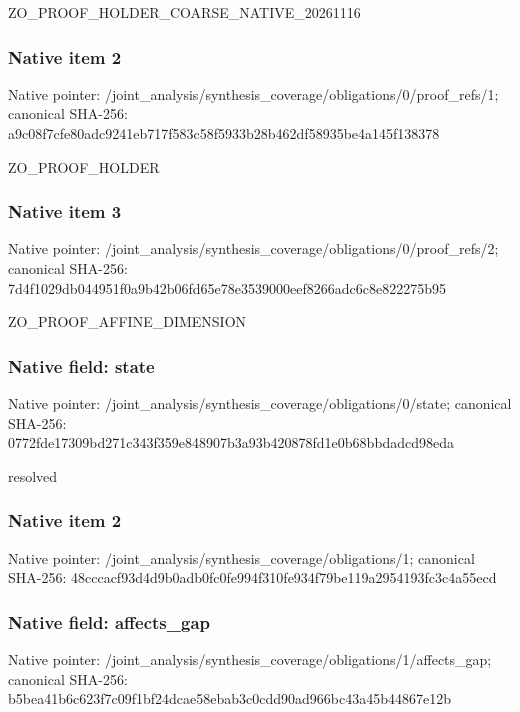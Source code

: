 \documentclass[10pt,a4paper]{article}
\begin{document}
\begingroup\raggedright\sloppy ZO\_\allowbreak{}PROOF\_\allowbreak{}HOLDER\_\allowbreak{}COARSE\_\allowbreak{}NATIVE\_\allowbreak{}20261116\par\endgroup

\subsubsection{Native item 2}
Native pointer: /joint\_\allowbreak{}analysis/synthesis\_\allowbreak{}coverage/obligations/0/proof\_\allowbreak{}refs/1; canonical SHA-256: a9c08f7cfe80adc9241eb717f583c58f5933b28b462df58935be4a145f138378

\begingroup\raggedright\sloppy ZO\_\allowbreak{}PROOF\_\allowbreak{}HOLDER\par\endgroup

\subsubsection{Native item 3}
Native pointer: /joint\_\allowbreak{}analysis/synthesis\_\allowbreak{}coverage/obligations/0/proof\_\allowbreak{}refs/2; canonical SHA-256: 7d4f1029db044951f0a9b42b06fd65e78e3539000eef8266adc6c8e822275b95

\begingroup\raggedright\sloppy ZO\_\allowbreak{}PROOF\_\allowbreak{}AFFINE\_\allowbreak{}DIMENSION\par\endgroup

\subsubsection{Native field: state}
Native pointer: /joint\_\allowbreak{}analysis/synthesis\_\allowbreak{}coverage/obligations/0/state; canonical SHA-256: 0772fde17309bd271c343f359e848907b3a93b420878fd1e0b68bbdadcd98eda

\begingroup\raggedright\sloppy resolved\par\endgroup

\subsubsection{Native item 2}
Native pointer: /joint\_\allowbreak{}analysis/synthesis\_\allowbreak{}coverage/obligations/1; canonical SHA-256: 48cccacf93d4d9b0adb0fc0fe994f310fe934f79be119a2954193fc3c4a55ecd

\subsubsection{Native field: affects\_\allowbreak{}gap}
Native pointer: /joint\_\allowbreak{}analysis/synthesis\_\allowbreak{}coverage/obligations/1/affects\_\allowbreak{}gap; canonical SHA-256: b5bea41b6c623f7c09f1bf24dcae58ebab3c0cdd90ad966bc43a45b44867e12b
\end{document}

